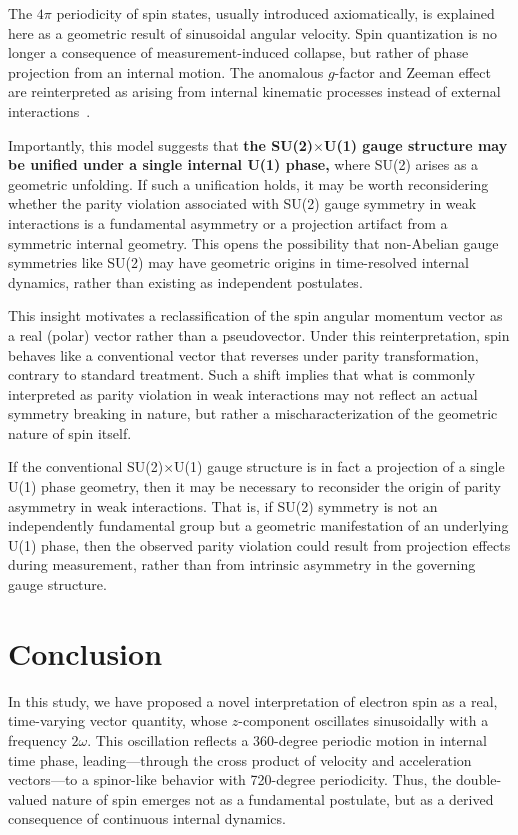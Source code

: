 \documentclass[%
 reprint,
 amsmath,amssymb,
 aps,
]{revtex4-1}
\numberwithin{equation}{section}%
\begin{document}
The $4\pi$ periodicity of spin states, usually introduced axiomatically, is explained here as a geometric result of sinusoidal angular velocity. Spin quantization is no longer a consequence of measurement-induced collapse, but rather of phase projection from an internal motion. The anomalous $g$-factor and Zeeman effect are reinterpreted as arising from internal kinematic processes instead of external interactions~\cite{hanamura2501.0130}.

Importantly, this model suggests that \textbf{the SU(2)$\times$U(1) gauge structure may be unified under a single internal U(1) phase,} where SU(2) arises as a geometric unfolding. If such a unification holds, it may be worth reconsidering whether the parity violation associated with SU(2) gauge symmetry in weak interactions is a fundamental asymmetry or a projection artifact from a symmetric internal geometry. This opens the possibility that non-Abelian gauge symmetries like SU(2) may have geometric origins in time-resolved internal dynamics, rather than existing as independent postulates.

This insight motivates a reclassification of the spin angular momentum vector as a real (polar) vector rather than a pseudovector. Under this reinterpretation, spin behaves like a conventional vector that reverses under parity transformation, contrary to standard treatment. Such a shift implies that what is commonly interpreted as parity violation in weak interactions may not reflect an actual symmetry breaking in nature, but rather a mischaracterization of the geometric nature of spin itself.

If the conventional SU(2)$\times$U(1) gauge structure is in fact a projection of a single U(1) phase geometry, then it may be necessary to reconsider the origin of parity asymmetry in weak interactions. That is, if SU(2) symmetry is not an independently fundamental group but a geometric manifestation of an underlying U(1) phase, then the observed parity violation could result from projection effects during measurement, rather than from intrinsic asymmetry in the governing gauge structure.


\section{Conclusion}
\label{sec:conclusion}

In this study, we have proposed a novel interpretation of electron spin as a real, time-varying vector quantity, whose $z$-component oscillates sinusoidally with a frequency $2\omega$. This oscillation reflects a 360-degree periodic motion in internal time phase, leading—through the cross product of velocity and acceleration vectors—to a spinor-like behavior with 720-degree periodicity. Thus, the double-valued nature of spin emerges not as a fundamental postulate, but as a derived consequence of continuous internal dynamics.
\end{document}
